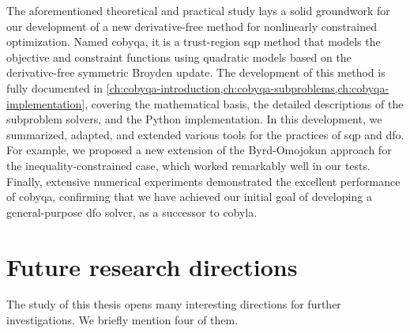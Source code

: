 The aforementioned theoretical and practical study lays a solid groundwork for our development of a new derivative-free method for nonlinearly constrained optimization.
Named \gls{cobyqa}, it is a trust-region \gls{sqp} method that models the objective and constraint functions using quadratic models based on the derivative-free symmetric Broyden update.
The development of this method is fully documented in \cref{ch:cobyqa-introduction,ch:cobyqa-subproblems,ch:cobyqa-implementation}, covering the mathematical basis, the detailed descriptions of the subproblem solvers, and the Python implementation.
In this development, we summarized, adapted, and extended various tools for the practices of \gls{sqp} and \gls{dfo}.
For example, we proposed a new extension of the Byrd-Omojokun approach for the inequality-constrained case, which worked remarkably well in our tests.
Finally, extensive numerical experiments demonstrated the excellent performance of \gls{cobyqa}, confirming that we have achieved our initial goal of developing a general-purpose \gls{dfo} solver, as a successor to \gls{cobyla}.

\section{Future research directions}

The study of this thesis opens many interesting directions for further investigations.
We briefly mention four of them.

